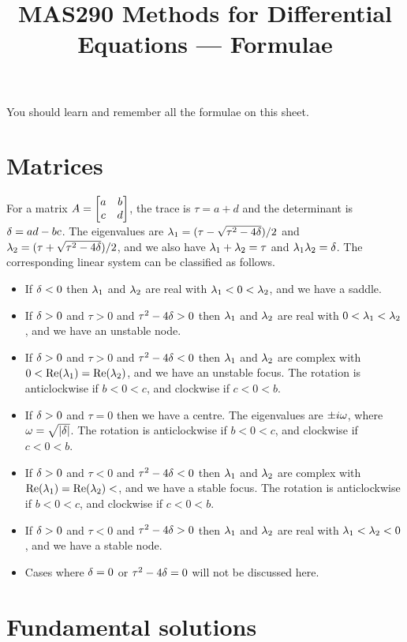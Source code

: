\documentclass[reqno]{amsart}
\begin{document}
\title{MAS290 Methods for Differential Equations --- Formulae}

\maketitle

You should learn and remember all the formulae on this sheet.

\section*{Matrices}

For a matrix $A=\left[\begin{matrix} a&b\\ c&d\end{matrix}\right]$, the trace is $\tau=a+d$ and the
determinant is $\delta=ad-bc$.  The eigenvalues are
$\lambda_1=(\tau-\sqrt{\tau^2-4\delta})/2$ and
$\lambda_2=(\tau+\sqrt{\tau^2-4\delta})/2$, and we also have
$\lambda_1+\lambda_2=\tau$ and $\lambda_1\lambda_2=\delta$.  The corresponding linear system
can be classified as follows.
\begin{itemize}
 \item If $\delta<0$ then $\lambda_1$ and $\lambda_2$ are real with
  $\lambda_1<0<\lambda_2$, and we have a saddle.
 \item If $\delta>0$ and $\tau>0$ and $\tau^2-4\delta>0$ then  $\lambda_1$ and
  $\lambda_2$ are real with $0<\lambda_1<\lambda_2$, and we have an unstable
  node. 
 \item If $\delta>0$ and $\tau>0$ and $\tau^2-4\delta<0$ then  $\lambda_1$ and
  $\lambda_2$ are complex with $0<\text{Re}(\lambda_1)=\text{Re}(\lambda_2)$, and
  we have an unstable focus.  The rotation is anticlockwise if
  $b<0<c$, and clockwise if $c<0<b$.
 \item If $\delta>0$ and $\tau=0$ then we have a centre.  The eigenvalues
  are $\pm i\omega$, where $\omega=\sqrt{|\delta|}$.  The rotation is
  anticlockwise if $b<0<c$, and clockwise if $c<0<b$.
 \item If $\delta>0$ and $\tau<0$ and $\tau^2-4\delta<0$ then  $\lambda_1$ and
  $\lambda_2$ are complex with $\text{Re}(\lambda_1)=\text{Re}(\lambda_2)<$, and
  we have a stable focus.  The rotation is anticlockwise if
  $b<0<c$, and clockwise if $c<0<b$.
 \item If $\delta>0$ and $\tau<0$ and $\tau^2-4\delta>0$ then  $\lambda_1$ and
  $\lambda_2$ are real with $\lambda_1<\lambda_2<0$, and we have a stable
  node.
 \item Cases where $\delta=0$ or $\tau^2-4\delta=0$ will not be discussed
  here. 
\end{itemize}

\section*{Fundamental solutions}
\end{document}
